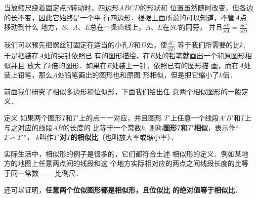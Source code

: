 当放缩尺绕着固定点$S$转动时，四边形$ABCD$的形状和
位置虽然随时改变，但各边的长不变，因此它始终是一个平
行四边形．根据上面所说的可以知道，不管$A$点移动到什么
地方，$S$、$A$、$E$总在一条直线上，$A$、$E$在$SC$的同旁，
并且$\frac{\overline{SE}}{\overline{SA}}=\frac{\overline{SC}}{\overline{SD}}$

我们可以预先把螺丝钉固定在适当的小孔$B$和$D$处，使$\frac{\overline{SC}}{\overline{SD}}$
等于我们所需要的比$k$, 于是把装在$A$处的尖针依照已
有的图形描绘，在$E$处的铅笔就画出一个和原图形相似并且
放大了$k$倍的图形．如果在$E$处装上一针，依照已有的图形描
画，而在$A$处装上铅笔，那么$A$处铅笔画出的图形也和原图
形相似，但是把它缩小了$k$倍．

前面我们研究了相似多边形和位似形，下面我们给出任
意两个相似图形的一般定义．

\begin{blk}
    {定义}
如果两个图形$T$和$T'$上的点一一对应，并且图形
$T'$上任意一个线段$\overline{A'B'}$和$T$上与之对应的线段$\overline{AB}$的长度的
比等于一个常数$k$, 则称\textbf{图形$T$和$T'$相似}，表示作“$T\backsim T'$”，
$k$叫作\textbf{$T'$对$T$的相似比}（也叫放大率或缩小率）．
\end{blk}

实际生活中，相似形的例子是很多的，它们都符合土述
相似形的定义．例如某地方的地图上任意两点间的线段和这
个地方实际相对应的两点之间线段长度的比等于同一常数
——比例尺．

还可以证明，\textbf{任意两个位似图形都是相似形，且位似比
的绝对值等于相似比}．


